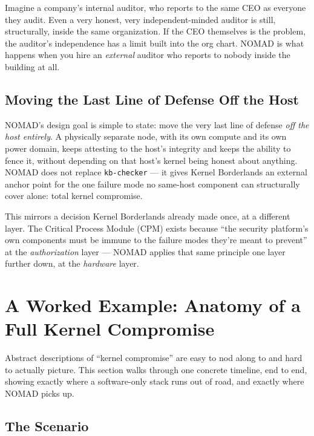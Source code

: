 \documentclass[11pt,a4paper]{article}
\begin{document}
\begin{analogybox}
Imagine a company's internal auditor, who reports to the same CEO as
everyone they audit. Even a very honest, very independent-minded
auditor is still, structurally, inside the same organization. If the
CEO themselves is the problem, the auditor's independence has a limit
built into the org chart. NOMAD is what happens when you hire an
\emph{external} auditor who reports to nobody inside the building at
all.
\end{analogybox}

\subsection{Moving the Last Line of Defense Off the Host}

NOMAD's design goal is simple to state: move the very last line of
defense \emph{off the host entirely}. A physically separate node, with
its own compute and its own power domain, keeps attesting to the
host's integrity and keeps the ability to fence it, without depending
on that host's kernel being honest about anything. NOMAD does not
replace \texttt{kb-checker} --- it gives Kernel Borderlands an external
anchor point for the one failure mode no same-host component can
structurally cover alone: total kernel compromise.

This mirrors a decision Kernel Borderlands already made once, at a
different layer. The Critical Process Module (CPM) exists because
``the security platform's own components must be immune to the failure
modes they're meant to prevent'' at the \emph{authorization} layer ---
NOMAD applies that same principle one layer further down, at the
\emph{hardware} layer.

\section{A Worked Example: Anatomy of a Full Kernel Compromise}
\label{sec:worked-example}

Abstract descriptions of ``kernel compromise'' are easy to nod along to
and hard to actually picture. This section walks through one concrete
timeline, end to end, showing exactly where a software-only stack runs
out of road, and exactly where NOMAD picks up.

\subsection{The Scenario}
\end{document}
